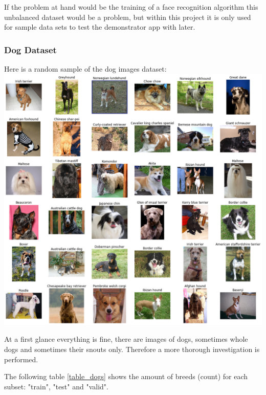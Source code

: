 \documentclass[paper=A4, DIV=10, parskip=half]{scrartcl}
\begin{document}


If the problem at hand would be the training of a face recognition algorithm
this unbalanced dataset would be a problem, but within this project it is only
used for sample data sets to test the demonstrator app with later.

\subsubsection*{Dog Dataset}

Here is a random sample of the dog images dataset:\\
\includegraphics[width=\textwidth]{images/dog_sample.png}

At a first glance everything is fine, there are images of dogs, sometimes whole
dogs and sometimes their snouts only. Therefore a more thorough investigation is
performed.

The following table \ref{table_dogs} shows the amount of breeds (count) for each
subset: "train", "test" and "valid".
\end{document}
